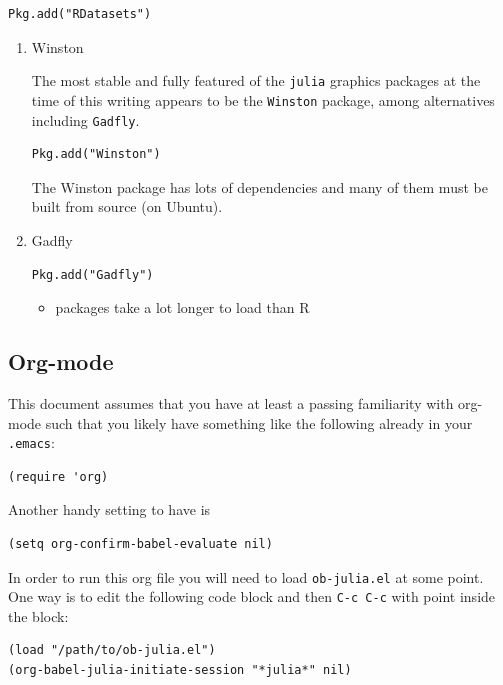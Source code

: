 \documentclass[11pt]{article}
\begin{document}
\begin{verbatim}
Pkg.add("RDatasets")
\end{verbatim}


\begin{enumerate}
\item Winston
\label{sec-1-2-1}

The most stable and fully featured of the \texttt{julia} graphics packages at the time of this writing appears to be the \texttt{Winston} package, among alternatives including \texttt{Gadfly}.

\begin{verbatim}
Pkg.add("Winston")
\end{verbatim}

The Winston package has lots of dependencies and many of them must be built from source (on Ubuntu).
\item Gadfly
\label{sec-1-2-2}

\begin{verbatim}
Pkg.add("Gadfly")
\end{verbatim}

\begin{itemize}
\item packages take a lot longer to load than R
\end{itemize}
\end{enumerate}
\subsection{Org-mode}
\label{sec-1-3}

This document assumes that you have at least a passing familiarity with org-mode such that you likely have something like the following already in your \texttt{.emacs}:

\begin{verbatim}
(require 'org)
\end{verbatim}

Another handy setting to have is

\begin{verbatim}
(setq org-confirm-babel-evaluate nil)
\end{verbatim}

In order to run this org file you will need to load \texttt{ob-julia.el} at some point. One way is to edit the following code block and then \texttt{C-c C-c} with point inside the block:

\begin{verbatim}
(load "/path/to/ob-julia.el")
(org-babel-julia-initiate-session "*julia*" nil)
\end{verbatim}
\end{document}
